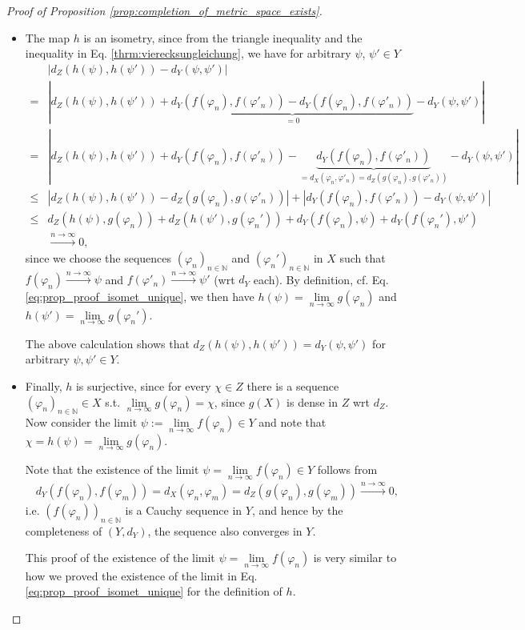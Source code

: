 \documentclass[12pt, a4paper]{article}
\numberwithin{equation}{section}
\theoremstyle{definition}
\theoremstyle{definition}
\newcommand{\abs}[1]{\left\vert #1 \right\vert}
\newcommand{\seq}[1][\varphi]{\left( #1 \right)_{n \in \mathbb{N}}}
\begin{document}
\begin{proof}[Proof of Proposition \ref{prop:completion_of_metric_space_exists}]
\begin{itemize}
			\item The map $h$ is an isometry, since from the triangle inequality and the inequality in Eq. \eqref{thrm:vierecksungleichung}, we have for arbitrary $\psi$, $\psi'\in Y$
			\begin{align*}
				&\abs{d_Z(h(\psi), h(\psi')) - d_Y(\psi, \psi')} 
				\\ = &\abs{d_Z(h(\psi), h(\psi')) + \underbrace{d_Y(f(\varphi_n), f(\varphi'_n)) - d_Y(f(\varphi_n), f(\varphi'_n))}_{=0} - d_Y(\psi, \psi')}
				\\ = &\abs{d_Z(h(\psi), h(\psi')) + d_Y(f(\varphi_n), f(\varphi'_n)) - \underbrace{d_Y(f(\varphi_n), f(\varphi'_n))}_{=d_X(\varphi_n, \varphi'_n) = d_Z(g(\varphi_n), g(\varphi'_n))} - d_Y(\psi, \psi')}
				\\ \leq &\abs{d_Z(h(\psi), h(\psi')) - d_Z(g(\varphi_n), g(\varphi'_n))} + \abs{d_Y(f(\varphi_n), f(\varphi'_n)) - d_Y(\psi, \psi')}
				\\ \leq &d_Z(h(\psi), g(\varphi_n)) + d_Z(h(\psi'), g(\varphi_n')) + d_Y(f(\varphi_n), \psi) + d_Y(f(\varphi_n'), \psi')
				\\ &\overset{n\to\infty}{\longrightarrow} 0, 
			\end{align*}
			since we choose the sequences $\seq[\varphi_n]$ and $\seq[\varphi_n']$ in $X$ such that $f(\varphi_n) \overset{n\to\infty}{\longrightarrow}\psi$ and $f(\varphi'_n) \overset{n\to\infty}{\longrightarrow}\psi'$ (wrt $d_Y$ each). By definition, cf. Eq. \eqref{eq:prop_proof_isomet_unique}, we then have $h(\psi) = \lim\limits_{n\to\infty}g(\varphi_n)$ and $h(\psi') = \lim\limits_{n\to\infty}g(\varphi_n')$.
			
			The above calculation shows that $d_Z(h(\psi), h(\psi')) = d_Y(\psi, \psi')$ for arbitrary $\psi, \psi'\in Y$.

			\item Finally, $h$ is surjective, since for every $\chi\in Z$ there is a sequence $\seq[\varphi_n]\in X$ s.t. $\lim\limits_{n\to\infty}g(\varphi_n) = \chi$, since $g(X)$ is dense in $Z$ wrt $d_Z$. Now consider the limit $\psi := \lim\limits_{n\to\infty} f(\varphi_n)\in Y$ and note that $\chi = h(\psi) = \lim\limits_{n\to\infty}g(\varphi_n)$.
			
			Note that the existence of the limit $\psi = \lim\limits_{n\to\infty} f(\varphi_n)\in Y$ follows from
			\begin{align}
				d_Y(f(\varphi_n), f(\varphi_m)) = d_X(\varphi_n, \varphi_m) = d_Z(g(\varphi_n), g(\varphi_m)) \overset{n\to\infty}{\longrightarrow} 0, 
			\end{align}
			i.e. $\seq[f(\varphi_n)]$ is a Cauchy sequence in $Y$, and hence by the completeness of $(Y, d_Y)$, the sequence also converges in $Y$.
			
			This proof of the existence of the limit $\psi = \lim\limits_{n\to\infty} f(\varphi_n)$ is very similar to how we proved the existence of the limit in Eq. \eqref{eq:prop_proof_isomet_unique} for the definition of $h$.
		\end{itemize}
	\end{proof}
\end{document}
